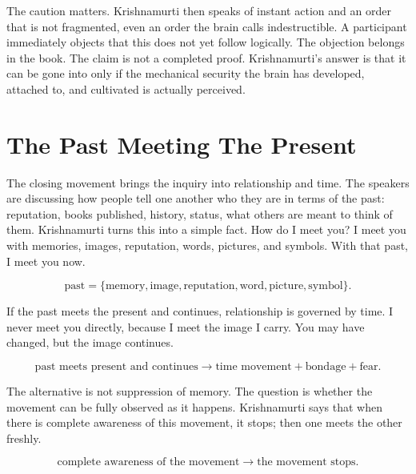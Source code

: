 \documentclass[11pt,oneside]{book}
\begin{document}
The caution matters. Krishnamurti then speaks of instant action and an order that is not fragmented, even an order the brain calls indestructible. A participant immediately objects that this does not yet follow logically. The objection belongs in the book. The claim is not a completed proof. Krishnamurti's answer is that it can be gone into only if the mechanical security the brain has developed, attached to, and cultivated is actually perceived.

\section{The Past Meeting The Present}

The closing movement brings the inquiry into relationship and time. The speakers are discussing how people tell one another who they are in terms of the past: reputation, books published, history, status, what others are meant to think of them. Krishnamurti turns this into a simple fact. How do I meet you? I meet you with memories, images, reputation, words, pictures, and symbols. With that past, I meet you now.

\begin{equation}
\text{past}
=
\{\text{memory},\text{image},\text{reputation},\text{word},\text{picture},\text{symbol}\}.
\end{equation}

If the past meets the present and continues, relationship is governed by time. I never meet you directly, because I meet the image I carry. You may have changed, but the image continues.

\begin{equation}
\text{past meets present and continues}
\longrightarrow
\text{time movement}
+
\text{bondage}
+
\text{fear}.
\end{equation}

The alternative is not suppression of memory. The question is whether the movement can be fully observed as it happens. Krishnamurti says that when there is complete awareness of this movement, it stops; then one meets the other freshly.

\begin{equation}
\text{complete awareness of the movement}
\longrightarrow
\text{the movement stops}.
\end{equation}
\end{document}

